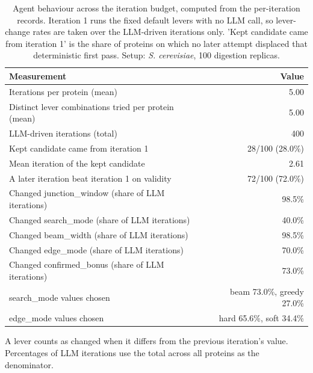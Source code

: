 \begin{table}[!tb]
  \centering
  \caption{Agent behaviour across the iteration budget, computed from the per-iteration records. Iteration 1 runs the fixed default levers with no LLM call, so lever-change rates are taken over the LLM-driven iterations only. 'Kept candidate came from iteration 1' is the share of proteins on which no later attempt displaced that deterministic first pass. Setup: \textnormal{\textnormal{\textit{S. cerevisiae}}}, 100 digestion replicas.}
  \label{tab:agent_behaviour_yeast_r100}
  \begin{tabular}{lr}
    \toprule
    Measurement & Value \\
    \midrule
    Iterations per protein (mean) & 5.00 \\
    Distinct lever combinations tried per protein (mean) & 5.00 \\
    LLM-driven iterations (total) & 400 \\
    Kept candidate came from iteration 1 & 28/100 (28.0\%) \\
    Mean iteration of the kept candidate & 2.61 \\
    A later iteration beat iteration 1 on validity & 72/100 (72.0\%) \\
    Changed junction\_window (share of LLM iterations) & 98.5\% \\
    Changed search\_mode (share of LLM iterations) & 40.0\% \\
    Changed beam\_width (share of LLM iterations) & 98.5\% \\
    Changed edge\_mode (share of LLM iterations) & 70.0\% \\
    Changed confirmed\_bonus (share of LLM iterations) & 73.0\% \\
    search\_mode values chosen & beam 73.0\%, greedy 27.0\% \\
    edge\_mode values chosen & hard 65.6\%, soft 34.4\% \\
    \bottomrule
  \end{tabular}
  \par\smallskip\footnotesize{A lever counts as changed when it differs from the previous iteration's value. Percentages of LLM iterations use the total across all proteins as the denominator.}
\end{table}
